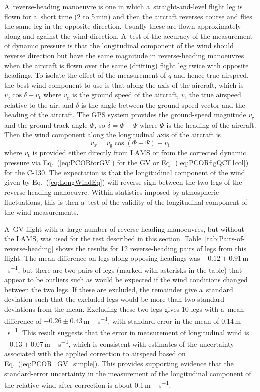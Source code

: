 \documentclass[amtd, online, hvmath]{copernicus}
\begin{document}
A~reverse-heading manoeuvre is one in which a~straight-and-level
flight leg is flown for a~short time (2 to 5\,min) and then the
aircraft reverses course and flies the same leg in the opposite
direction.  Usually these are flown approximately along and against
the wind direction.  A~test of the accuracy of the measurement of
dynamic pressure is that the longitudinal component of the wind should
reverse direction but have the same magnitude in reverse-heading
manoeuvres when the aircraft is flown over the same (drifting) flight
leg twice with opposite headings.  To isolate the effect of the
measurement of $q$ and hence true airspeed, the best wind component to
use is that along the axis of the aircraft, which is
$v_{\mathrm{g}}\cos\delta-v_{\mathrm{t}}$ where $v_{\mathrm{g}}$ is the ground speed of the
aircraft, $v_{\mathrm{t}}$ the true airspeed relative to the air, and
$\delta$ is the angle between the ground-speed vector and the heading
of the aircraft. The GPS system provides the ground-speed magnitude
$v_{\mathrm{g}}$ and the ground track angle $\Phi$, so $\delta= \Phi-\Psi$ where
$\Psi$ is the heading of the aircraft. Then the wind component along
the longitudinal axis of the aircraft is
\begin{equation}
v_x=v_{\mathrm{g}}\cos(\Phi-\Psi)-v_{\mathrm{t}}\label{eq:LongWindEq}
\end{equation}
where $v_{\mathrm{t}}$ is provided either directly from LAMS or from
the corrected dynamic pressure via Eq.~(\ref{eq:PCORforGV}) for the GV
or Eq.~(\ref{eq:PCORfigQCF1col}) for the C-130. The expectation is
that the longitudinal component of the wind given by
Eq.~(\ref{eq:LongWindEq}) will reverse sign between the two legs of
the reverse-heading manoeuvre. Within statistics imposed by
atmospheric fluctuations, this is then a~test of the validity of the
longitudinal component of the wind measurements.

A~GV flight with a~large number of reverse-heading manoeuvres, but
without the LAMS, was used for the test described in this section.
Table~\ref{tab:Pairs-of-reverse-heading} shows the results for 12
reverse-heading pairs of legs from this flight. The mean difference on
legs along opposing headings was $-0.12\pm0.91$\,\unit{m\,s^{-1}},
but there are two pairs of legs (marked with asterisks in the table)
that appear to be outliers such as would be expected if the wind
conditions changed between the two legs. If these are excluded, the
remainder give a~standard deviation such that the excluded legs would
be more than two standard deviations from the mean. Excluding these
two legs gives 10 legs with a~mean difference of
$-0.26\pm 0.43$\,\unit{m\,s^{-1}}, with standard error in the mean
of 0.14\,\unit{m\,s^{-1}}. This result suggests that the error in
measurement of longitudinal wind is
$-0.13\pm0.07$\,\unit{m\,s^{-1}}, which is consistent with
estimates of the uncertainty associated with the applied correction to
airspeed based on Eq.~(\ref{eq:PCOR_GV_simple}). This provides
supporting evidence that the standard-error uncertainty in the
measurement of the longitudinal component of the relative wind after
correction is about 0.1\,\unit{m\,s^{-1}}.
\end{document}
